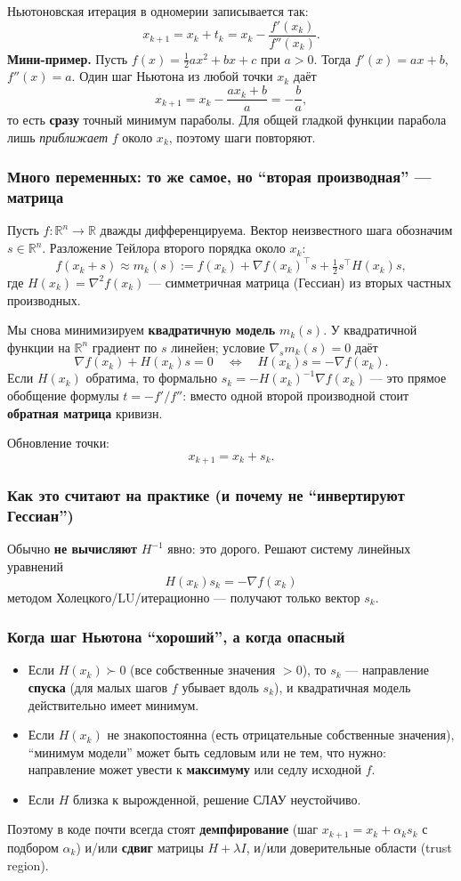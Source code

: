 \documentclass[12pt,a4paper]{article}
\newcommand{\R}{\mathbb{R}}
\newcommand{\grad}{\nabla}
\begin{document}
Ньютоновская итерация в одномерии записывается так:
\[
  x_{k+1}=x_k+t_k=x_k-\frac{f'(x_k)}{f''(x_k)}.
\]
\textbf{Мини-пример.} Пусть \(f(x)=\tfrac12 a x^2+bx+c\) при \(a>0\). Тогда \(f'(x)=ax+b\), \(f''(x)=a\). Один шаг Ньютона из любой точки \(x_k\) даёт
\[
  x_{k+1}=x_k-\frac{ax_k+b}{a}=-\frac{b}{a},
\]
то есть \textbf{сразу} точный минимум параболы. Для общей гладкой функции парабола лишь \emph{приближает} \(f\) около \(x_k\), поэтому шаги повторяют.

\subsubsection{Много переменных: то же самое, но ``вторая производная'' --- матрица}
Пусть \(f:\R^n\to\R\) дважды дифференцируема. Вектор неизвестного шага обозначим \(s\in\R^n\). Разложение Тейлора второго порядка около \(x_k\):
\[
  f(x_k+s)\approx m_k(s):= f(x_k)+\grad f(x_k)^\top s+\tfrac12 s^\top H(x_k)s,
\]
где \(H(x_k)=\nabla^2 f(x_k)\) --- симметричная матрица (Гессиан) из вторых частных производных.

Мы снова минимизируем \textbf{квадратичную модель} \(m_k(s)\). У квадратичной функции на \(\R^n\) градиент по \(s\) линейен; условие \(\nabla_s m_k(s)=0\) даёт
\[
  \grad f(x_k)+H(x_k)s=0
  \quad\Leftrightarrow\quad
  H(x_k)s=-\grad f(x_k).
\]
Если \(H(x_k)\) обратима, то формально \(s_k=-H(x_k)^{-1}\grad f(x_k)\) --- это прямое обобщение формулы \(t=-f'/f''\): вместо одной второй производной стоит \textbf{обратная матрица} кривизн.

Обновление точки:
\[
  x_{k+1}=x_k+s_k.
\]

\subsubsection{Как это считают на практике (и почему не ``инвертируют Гессиан'')}
Обычно \textbf{не вычисляют} \(H^{-1}\) явно: это дорого. Решают систему линейных уравнений
\[
  H(x_k)s_k=-\grad f(x_k)
\]
методом Холецкого/LU/итерационно --- получают только вектор \(s_k\).

\subsubsection{Когда шаг Ньютона ``хороший'', а когда опасный}
\begin{itemize}
  \item Если \(H(x_k)\succ 0\) (все собственные значения \(>0\)), то \(s_k\) --- направление \textbf{спуска} (для малых шагов \(f\) убывает вдоль \(s_k\)), и квадратичная модель действительно имеет минимум.
  \item Если \(H(x_k)\) не знакопостоянна (есть отрицательные собственные значения), ``минимум модели'' может быть седловым или не тем, что нужно: направление может увести к \textbf{максимуму} или седлу исходной \(f\).
  \item Если \(H\) близка к вырожденной, решение СЛАУ неустойчиво.
\end{itemize}
Поэтому в коде почти всегда стоят \textbf{демпфирование} (шаг \(x_{k+1}=x_k+\alpha_k s_k\) с подбором \(\alpha_k\)) и/или \textbf{сдвиг} матрицы \(H+\lambda I\), и/или доверительные области (trust region).
\end{document}
